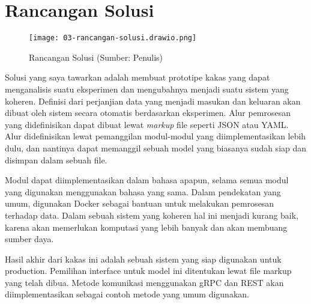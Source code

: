 \section{Rancangan Solusi}
\begin{figure}[h]
  \centering
  \texttt{[image: 03-rancangan-solusi.drawio.png]}
  \caption{Rancangan Solusi (Sumber: Penulis)}
\end{figure}

Solusi yang saya tawarkan adalah membuat prototipe kakas yang dapat menganalisis suatu eksperimen dan mengubahnya menjadi suatu sistem yang koheren.
Definisi dari perjanjian data yang menjadi masukan dan keluaran akan dibuat oleh sistem secara otomatis berdasarkan eksperimen.
Alur pemrosesan yang didefinisikan dapat dibuat lewat \textit{markup} file seperti JSON atau YAML.
Alur didefinisikan lewat pemanggilan modul-modul yang diimplementasikan lebih dulu, dan nantinya dapat memanggil sebuah model yang biasanya sudah siap dan disimpan dalam sebuah file.

Modul dapat diimplementasikan dalam bahasa apapun, selama semua modul yang digunakan menggunakan bahasa yang sama.
Dalam pendekatan yang umum, digunakan Docker sebagai bantuan untuk melakukan pemrosesan terhadap data.
Dalam sebuah sistem yang koheren hal ini menjadi kurang baik, karena akan memerlukan komputasi yang lebih banyak dan akan membuang sumber daya.

Hasil akhir dari kakas ini adalah sebuah sistem yang siap digunakan untuk production.
Pemilihan interface untuk model ini ditentukan lewat file markup yang telah dibua.
Metode komunikasi menggunakan gRPC dan REST akan diimplementasikan sebagai contoh metode yang umum digunakan.

